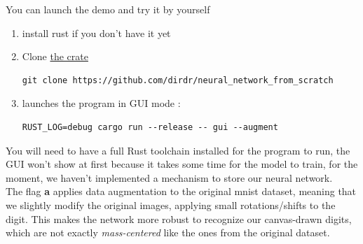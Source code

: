 \documentclass[a4paper, twocolumn, twoside]{article}
\begin{document}
	You can launch the demo and try it by yourself
	\begin{enumerate}
		\item install rust if you don't have it yet
		\item Clone \href{https://github.com/dirdr/neural_network_from_scratch}{the crate}\\
\begin{verbatim}
git clone https://github.com/dirdr/neural_network_from_scratch
\end{verbatim}
		\item launches the program in GUI mode : 
\begin{verbatim}
RUST_LOG=debug cargo run --release -- gui --augment
\end{verbatim}
	\end{enumerate}

	You will need to have a full Rust toolchain installed for the program to run,
	the GUI won't show at first because it takes some time for the model to train,  for the moment, we haven't implemented a mechanism to store our neural network.\\
	The flag \textbf{a} applies data augmentation to the original mnist dataset, meaning that we slightly modify the original images,
	applying small rotations/shifts to the digit. This makes the network more robust to recognize our canvas-drawn digits,
	which are not exactly \textit{mass-centered} like the ones from the original dataset.
\end{document}
